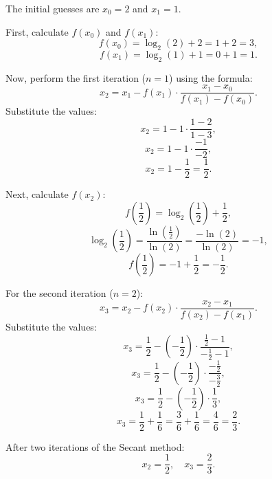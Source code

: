 \documentclass[12pt]{article}
\begin{document}
\begin{enumerate}
The initial guesses are \( x_0 = 2 \) and \( x_1 = 1 \).

First, calculate \( f(x_0) \) and \( f(x_1) \):
\[
f(x_0) = \log_2(2) + 2 = 1 + 2 = 3,
\]
\[
f(x_1) = \log_2(1) + 1 = 0 + 1 = 1.
\]

Now, perform the first iteration (\( n = 1 \)) using the formula:
\[
x_2 = x_1 - f(x_1) \cdot \frac{x_1 - x_0}{f(x_1) - f(x_0)}.
\]
Substitute the values:
\[
x_2 = 1 - 1 \cdot \frac{1 - 2}{1 - 3},
\]
\[
x_2 = 1 - 1 \cdot \frac{-1}{-2},
\]
\[
x_2 = 1 - \frac{1}{2} = \frac{1}{2}.
\]

Next, calculate \( f(x_2) \):
\[
f\left(\frac{1}{2}\right) = \log_2\left(\frac{1}{2}\right) + \frac{1}{2},
\]
\[
\log_2\left(\frac{1}{2}\right) = \frac{\ln\left(\frac{1}{2}\right)}{\ln(2)} = \frac{-\ln(2)}{\ln(2)} = -1,
\]
\[
f\left(\frac{1}{2}\right) = -1 + \frac{1}{2} = -\frac{1}{2}.
\]

For the second iteration (\( n = 2 \)):
\[
x_3 = x_2 - f(x_2) \cdot \frac{x_2 - x_1}{f(x_2) - f(x_1)}.
\]
Substitute the values:
\[
x_3 = \frac{1}{2} - \left(-\frac{1}{2}\right) \cdot \frac{\frac{1}{2} - 1}{-\frac{1}{2} - 1},
\]
\[
x_3 = \frac{1}{2} - \left(-\frac{1}{2}\right) \cdot \frac{-\frac{1}{2}}{-\frac{3}{2}},
\]
\[
x_3 = \frac{1}{2} - \left(-\frac{1}{2}\right) \cdot \frac{1}{3},
\]
\[
x_3 = \frac{1}{2} + \frac{1}{6} = \frac{3}{6} + \frac{1}{6} = \frac{4}{6} = \frac{2}{3}.
\]

After two iterations of the Secant method:
\[
x_2 = \frac{1}{2}, \quad x_3 = \frac{2}{3}.
\]

\end{enumerate}
\end{document}
